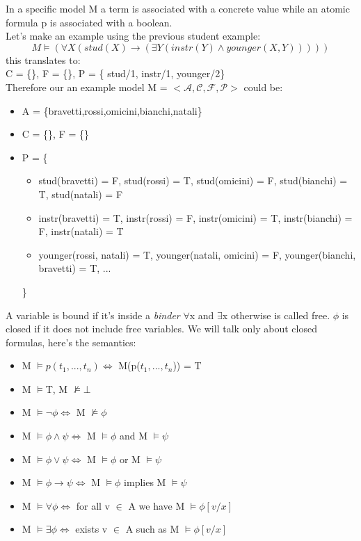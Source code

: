 \documentclass[12pt]{article}
\begin{document}
In a specific model M a term is associated with a concrete value while an atomic formula p is associated with a boolean.
\\ Let's make an example using the previous student example: 
\[
M \models (\forall X (stud(X) \rightarrow ( \exists Y(instr(Y) \land younger(X,Y)))))
\]
this translates to: 
\\ C = \{\}, F = \{\}, P = \{ stud/1, instr/1, younger/2\}
\\ Therefore our an example model M = $<\mathcal{A,C,F,P}>$ could be: 
\begin{itemize}
    \item A = \{bravetti,rossi,omicini,bianchi,natali\}
    \item C = \{\}, F = \{\}
    \item P = \{ 
            \begin{itemize}
                \item stud(bravetti) = F, stud(rossi) = T, stud(omicini) = F, stud(bianchi) = T, stud(natali) = F
                \item instr(bravetti) = T, instr(rossi) = F, instr(omicini) = T, instr(bianchi) = F, instr(natali) = T
                \item younger(rossi, natali) = T, younger(natali, omicini) = F, younger(bianchi, bravetti) = T, ...
            \end{itemize}
        \}
\end{itemize}
A variable is bound if it's inside a \emph{binder} $\forall$x and $\exists$x otherwise is called free. $\phi$ is closed if it does not include free variables.
We will talk only about closed formulas, here's the semantics: 
\begin{itemize}
    \item M $\models p(t_1, ... , t_n) \Longleftrightarrow$ M(p($t_1, ... , t_n$)) = T
    \item M $\models $T, M $\not\models \bot$ 
    \item M $\models \neg \phi \Longleftrightarrow$ M $\not\models \phi$
    \item M $\models \phi \land \psi \Longleftrightarrow$ M $\models \phi$ and M $\models \psi$
    \item M $\models \phi \lor \psi \Longleftrightarrow$ M $\models \phi$ or M $\models \psi$
    \item M $\models \phi \rightarrow \psi \Longleftrightarrow$ M $\models \phi$ implies M $\models \psi$
    \item M $\models \forall \phi \Longleftrightarrow$ for all v $\in$ A we have M $ \models \phi[v/x]$
    \item M $\models \exists \phi \Longleftrightarrow$ exists v $\in$ A such as M $ \models \phi[v/x]$
\end{itemize}
\end{document}
